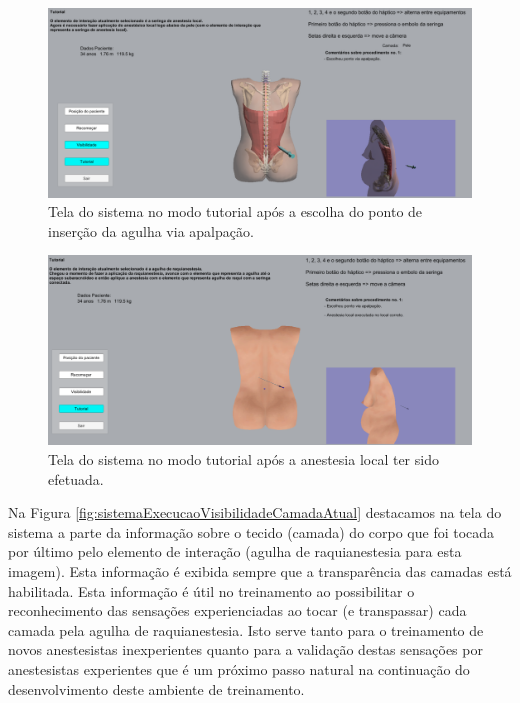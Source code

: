 \begin{figure}[ht!]
    \centering
    \includegraphics[width=\textwidth]{capitulos/figuras/sistemaExecucaoTutorialAnestesiaLocal.png} 
    \caption{Tela do sistema no modo tutorial após a escolha do ponto de inserção da agulha via apalpação.}
    \label{fig:sistemaExecucaoTutorialAnestesiaLocal}
\end{figure}

\begin{figure}[ht!]
    \centering
    \includegraphics[width=\textwidth]{capitulos/figuras/sistemaExecucaoTutorialRaqui.png} 
    \caption{Tela do sistema no modo tutorial após a anestesia local ter sido efetuada.}
    \label{fig:sistemaExecucaoTutorialRaqui}
\end{figure}

Na Figura \ref{fig:sistemaExecucaoVisibilidadeCamadaAtual} destacamos na tela do sistema a parte da informação sobre o tecido (camada) do corpo que foi tocada por último pelo elemento de interação (agulha de raquianestesia para esta imagem). Esta informação é exibida sempre que a transparência das camadas está habilitada. Esta informação é útil no treinamento ao possibilitar o reconhecimento das sensações experienciadas ao tocar (e transpassar) cada camada pela agulha de raquianestesia. Isto serve tanto para o treinamento de novos anestesistas inexperientes quanto para a validação destas sensações por anestesistas experientes que é um próximo passo natural na continuação do desenvolvimento deste ambiente de treinamento.

